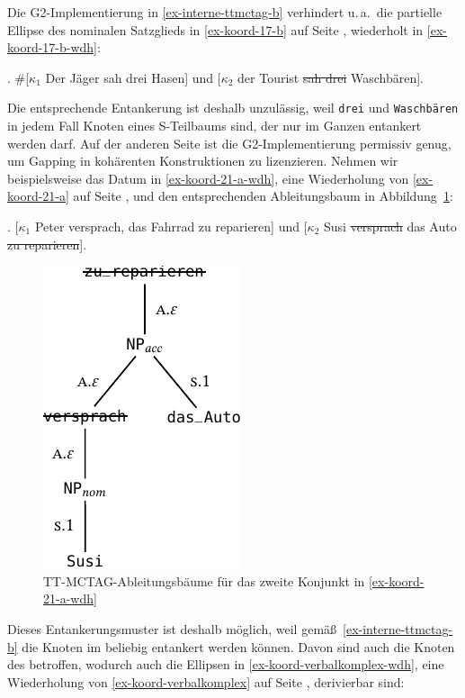 Die G2-Implementierung in \ref{ex-interne-ttmctag-b} verhindert u.\,a.\ die partielle Ellipse des nominalen Satzglieds in \ref{ex-koord-17-b} auf Seite \pageref{ex-koord-17-b}, wiederholt in \ref{ex-koord-17-b-wdh}:

\ex. \#[$\kappa_1$ Der Jäger sah drei Hasen] und [$\kappa_2$ der Tourist \sout{sah drei} Waschbären].\label{ex-koord-17-b-wdh}

Die entsprechende Entankerung ist deshalb unzulässig, weil {\tt drei} und {\tt Waschbä\-ren} in jedem Fall Knoten eines S-Teilbaums sind, der nur im Ganzen entankert werden darf. Auf der  anderen Seite ist die G2-Implementierung permissiv genug, um Gapping in kohärenten Konstruktionen zu lizenzieren. Nehmen wir beispielsweise das Datum in \ref{ex-koord-21-a-wdh}, eine Wiederholung von \ref{ex-koord-21-a} auf Seite \pageref{ex-koord-21-a}, und den entsprechenden Ableitungsbaum in Abbildung~\ref{fig-deanchoring-koord-18}:

\ex. \label{ex-koord-21-a-wdh} [$\kappa_1$ Peter versprach, das Fahrrad zu reparieren] und [$\kappa_2$ Susi \sout{versprach} das Auto \sout{zu reparieren}].

\begin{figure}[t]
\centering
\includegraphics{graphics/abb827.pdf}
\caption{\label{fig-deanchoring-koord-18}TT-MCTAG-Ableitungsbäume für das zweite Konjunkt in \ref{ex-koord-21-a-wdh}}
\end{figure}
Dieses Entankerungsmuster ist deshalb möglich, weil gemä\ss\ \ref{ex-interne-ttmctag-b} die Knoten im  beliebig entankert werden können. Davon sind auch die Knoten des  betroffen, wodurch auch die Ellipsen in \ref{ex-koord-verbalkomplex-wdh}, eine Wiederholung von \ref{ex-koord-verbalkomplex} auf Seite \pageref{ex-koord-verbalkomplex}, derivierbar sind:  

